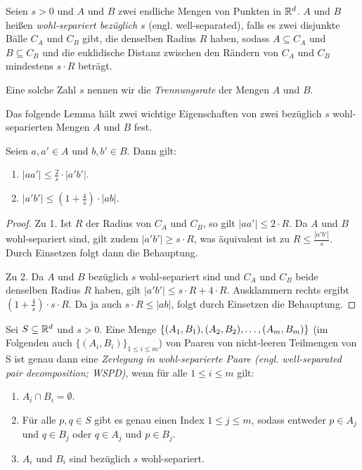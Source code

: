 \begin{definition}
   	\label{def:wellsep}
   	Seien $s > 0$ und $A$ und $B$ zwei endliche Mengen von Punkten in $\mathbb{R}^d$. 
   	$A$ und $B$ heißen \emph{wohl-separiert bezüglich $s$} (engl. well-separated), falls es zwei disjunkte Bälle $C_A$ und $C_B$ gibt, die denselben Radius $R$ haben, sodass $A \subseteq C_A$ und $B \subseteq C_B$ und die euklidische Distanz zwischen den Rändern von $C_A$ und $C_B$ mindestens $s\cdot R$ beträgt.

	Eine solche Zahl $s$ nennen wir die \emph{Trennungsrate} der Mengen $A$ und $B$.
\end{definition}

Das folgende Lemma hält zwei wichtige Eigenschaften von zwei bezüglich $s$ wohl-separierten Mengen $A$ und $B$ fest.
\begin{lemma}
   	\label{lem:wellsep}
	Seien $a, a' \in A$ und $b, b' \in B$. Dann gilt:
	\begin{enumerate}
		\item $\displaystyle |aa'| \leq \frac{2}{s}\cdot|a'b'|$.
		\item $\displaystyle |a'b'| \leq (1+\frac{4}{s})\cdot|ab|$.
	\end{enumerate}
\end{lemma}
\begin{proof}
   	Zu 1. Ist $R$ der Radius von $C_A$ und $C_B$, so gilt $|aa'| \leq 2 \cdot R$. Da $A$ und $B$ wohl-separiert sind, gilt zudem $|a'b'| \geq s \cdot R$, was äquivalent ist zu $R \leq \frac{|a'b'|}{s}$. Durch Einsetzen folgt dann die Behauptung.
   	
   	Zu 2. Da $A$ und $B$ bezüglich $s$ wohl-separiert sind und $C_A$ und $C_B$ beide denselben Radius $R$ haben, gilt $|a'b'| \leq s \cdot R + 4 \cdot R$. Ausklammern rechts ergibt $(1 + \frac{4}{s}) \cdot s \cdot R$. Da ja auch $s \cdot R \leq |ab|$, folgt durch Einsetzen die Behauptung.
\end{proof}

\begin{definition}[WSPD]
   	\label{def:wspd}
   	Sei $S \subseteq \mathbb{R}^d$ und $s > 0$. 
   	Eine Menge $ \{(A_1, B_1), (A_2, B_2), \mathellipsis, (A_m, B_m)\}$ (im Folgenden auch $\{(A_i, B_i)\}_{1 \leq i \leq m}$) von Paaren von nicht-leeren Teilmengen von S ist genau dann eine \emph{Zerlegung in wohl-separierte Paare (engl. well-separated pair decomposition; WSPD)}, wenn für alle $1 \leq i \leq m$ gilt:
   	\begin{enumerate}[label={(\arabic*)}, itemsep=0mm]
   		\item $A_i \cap B_i = \emptyset$.
   		\item Für alle $p, q \in S$ gibt es genau einen Index $1 \leq j \leq m$, sodass entweder $p \in A_j$ und $q \in B_j$ oder $q \in A_j$ und $p \in B_j$.
   		\item $A_i$ und $B_i$ sind bezüglich $s$ wohl-separiert.
   	\end{enumerate}
\end{definition}

